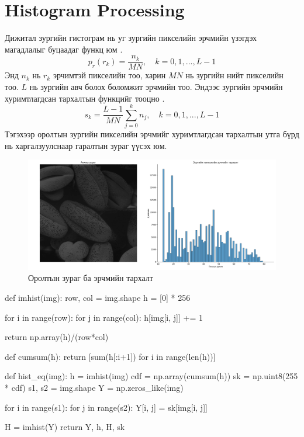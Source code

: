 \documentclass[a4paper]{article}
\begin{document}
\section{Histogram Processing}
Дижитал зургийн гистограм нь уг зургийн пикселийн эрчмийн үзэгдэх магадлалыг буцаадаг функц юм \cite{gonzalez2009digital}. 
\begin{equation}
p_r(r_k) = \frac{n_k}{MN}, \quad k = 0, 1, ..., L - 1
\end{equation}
Энд $n_k$ нь $r_k$ эрчимтэй пикселийн тоо, харин $MN$ нь зургийн нийт пикселийн тоо. $L$ нь зургийн авч болох боломжит эрчмийн тоо. Эндээс зургийн эрчмийн хуримтлагдсан тархалтын функцийг тооцно \cite{gonzalez2009digital}.
\begin{equation}
s_k = \frac{L-1}{MN} \sum_{j=0}^{k} n_j, \quad k = 0, 1, ..., L-1
\end{equation}
Тэгэхээр оролтын зургийн пикселийн эрчмийг хуримтлагдсан тархалтын утга бүрд нь харгалзуулснаар гаралтын зураг үүсэх юм.
\begin{figure}[H]
  \centering
  \includegraphics[scale = 0.30]{global_hist_eq_task_1.png}
  \caption[Intensity 1]{Оролтын зураг ба эрчмийн тархалт}
\end{figure}
\begin{python}
def imhist(img):
    row, col = img.shape
    h = [0] * 256

    for i in range(row):
        for j in range(col):
            h[img[i, j]] += 1
    
    return np.array(h)/(row*col)

def cumsum(h):
    return [sum(h[:i+1]) for i in range(len(h))]

def hist_eq(img):
    h = imhist(img)
    cdf = np.array(cumsum(h)) 
    sk = np.uint8(255 * cdf)
    s1, s2 = img.shape
    Y = np.zeros_like(img)
    
    for i in range(s1):
        for j in range(s2):
            Y[i, j] = sk[img[i, j]]
            
    H = imhist(Y)
    return Y, h, H, sk
\end{python}
\end{document}
